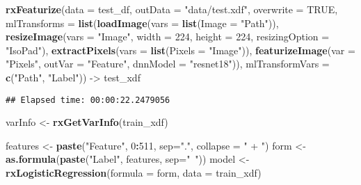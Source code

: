 \documentclass[]{book}
\newenvironment{Shaded}{\begin{snugshade}}{\end{snugshade}}
\newcommand{\KeywordTok}[1]{\textcolor[rgb]{0.13,0.29,0.53}{\textbf{#1}}}
\newcommand{\DataTypeTok}[1]{\textcolor[rgb]{0.13,0.29,0.53}{#1}}
\newcommand{\DecValTok}[1]{\textcolor[rgb]{0.00,0.00,0.81}{#1}}
\newcommand{\StringTok}[1]{\textcolor[rgb]{0.31,0.60,0.02}{#1}}
\newcommand{\OtherTok}[1]{\textcolor[rgb]{0.56,0.35,0.01}{#1}}
\newcommand{\OperatorTok}[1]{\textcolor[rgb]{0.81,0.36,0.00}{\textbf{#1}}}
\newcommand{\NormalTok}[1]{#1}
\theoremstyle{definition}
\theoremstyle{definition}
\theoremstyle{definition}
\theoremstyle{remark}
\begin{document}
\begin{Shaded}
\begin{Highlighting}[]
\KeywordTok{rxFeaturize}\NormalTok{(}\DataTypeTok{data =}\NormalTok{ test_df, }\DataTypeTok{outData =} \StringTok{"data/test.xdf"}\NormalTok{, }\DataTypeTok{overwrite =} \OtherTok{TRUE}\NormalTok{,}
            \DataTypeTok{mlTransforms =} \KeywordTok{list}\NormalTok{(}\KeywordTok{loadImage}\NormalTok{(}\DataTypeTok{vars =} \KeywordTok{list}\NormalTok{(}\DataTypeTok{Image =} \StringTok{"Path"}\NormalTok{)),}
                                \KeywordTok{resizeImage}\NormalTok{(}\DataTypeTok{vars =} \StringTok{"Image"}\NormalTok{, }\DataTypeTok{width =} \DecValTok{224}\NormalTok{, }\DataTypeTok{height =} \DecValTok{224}\NormalTok{,}
                                            \DataTypeTok{resizingOption =} \StringTok{"IsoPad"}\NormalTok{),}
                                \KeywordTok{extractPixels}\NormalTok{(}\DataTypeTok{vars =} \KeywordTok{list}\NormalTok{(}\DataTypeTok{Pixels =} \StringTok{"Image"}\NormalTok{)),}
                                \KeywordTok{featurizeImage}\NormalTok{(}\DataTypeTok{var =} \StringTok{"Pixels"}\NormalTok{, }
                                               \DataTypeTok{outVar =} \StringTok{"Feature"}\NormalTok{, }
                                               \DataTypeTok{dnnModel =} \StringTok{"resnet18"}\NormalTok{)),}
            \DataTypeTok{mlTransformVars =} \KeywordTok{c}\NormalTok{(}\StringTok{"Path"}\NormalTok{, }\StringTok{"Label"}\NormalTok{)) ->}\StringTok{ }\NormalTok{test_xdf}
\end{Highlighting}
\end{Shaded}

\begin{verbatim}
## Elapsed time: 00:00:22.2479056
\end{verbatim}

\begin{Shaded}
\begin{Highlighting}[]
\NormalTok{varInfo <-}\StringTok{ }\KeywordTok{rxGetVarInfo}\NormalTok{(train_xdf)}

\NormalTok{features <-}\StringTok{ }\KeywordTok{paste}\NormalTok{(}\StringTok{"Feature"}\NormalTok{, }\DecValTok{0}\OperatorTok{:}\DecValTok{511}\NormalTok{, }\DataTypeTok{sep=}\StringTok{"."}\NormalTok{, }\DataTypeTok{collapse =} \StringTok{" + "}\NormalTok{)}
\NormalTok{form <-}\StringTok{ }\KeywordTok{as.formula}\NormalTok{(}\KeywordTok{paste}\NormalTok{(}\StringTok{"Label"}\NormalTok{, features, }\DataTypeTok{sep=}\StringTok{"~"}\NormalTok{))}
\NormalTok{model <-}\StringTok{ }\KeywordTok{rxLogisticRegression}\NormalTok{(}\DataTypeTok{formula =}\NormalTok{ form, }\DataTypeTok{data =}\NormalTok{ train_xdf)}
\end{Highlighting}
\end{Shaded}
\end{document}
